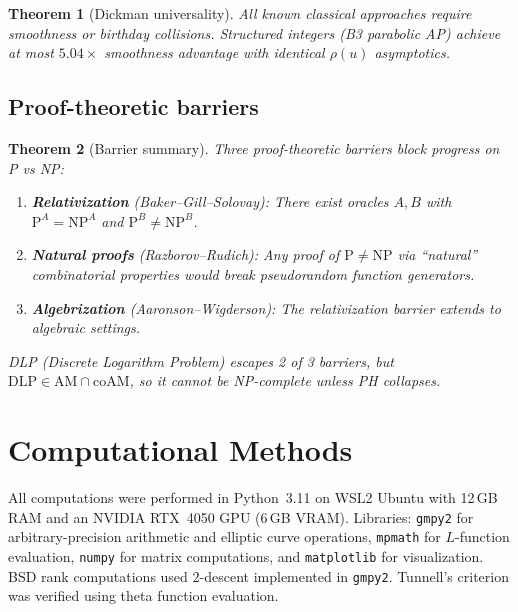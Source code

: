 \documentclass[12pt]{amsart}
\newtheorem{theorem}{Theorem}[section]
\theoremstyle{definition}
\theoremstyle{remark}
\begin{document}
\begin{theorem}[Dickman universality]\label{thm:dickman-univ}
All known classical approaches require smoothness or birthday collisions.
Structured integers (B3 parabolic AP) achieve at most $5.04\times$ smoothness
advantage with identical $\rho(u)$ asymptotics.
\end{theorem}

\subsection{Proof-theoretic barriers}

\begin{theorem}[Barrier summary]\label{thm:barriers}
Three proof-theoretic barriers block progress on P vs NP:
\begin{enumerate}[label=(\roman*)]
  \item \textbf{Relativization} (Baker--Gill--Solovay): There exist oracles
    $A, B$ with $\mathrm{P}^A = \mathrm{NP}^A$ and
    $\mathrm{P}^B \neq \mathrm{NP}^B$.
  \item \textbf{Natural proofs} (Razborov--Rudich): Any proof of $\mathrm{P}
    \neq \mathrm{NP}$ via ``natural'' combinatorial properties would break
    pseudorandom function generators.
  \item \textbf{Algebrization} (Aaronson--Wigderson): The relativization
    barrier extends to algebraic settings.
\end{enumerate}
DLP (Discrete Logarithm Problem) escapes 2 of 3 barriers, but
$\mathrm{DLP} \in \mathrm{AM} \cap \mathrm{coAM}$, so it cannot be
NP-complete unless PH collapses.
\end{theorem}

\section{Computational Methods}\label{sec:computational}

All computations were performed in Python~3.11 on WSL2 Ubuntu with 12\,GB
RAM and an NVIDIA RTX~4050 GPU (6\,GB VRAM). Libraries: \texttt{gmpy2} for
arbitrary-precision arithmetic and elliptic curve operations, \texttt{mpmath}
for $L$-function evaluation, \texttt{numpy} for matrix computations, and
\texttt{matplotlib} for visualization. BSD rank computations used
$2$-descent implemented in \texttt{gmpy2}. Tunnell's criterion was verified
using theta function evaluation.
\end{document}
